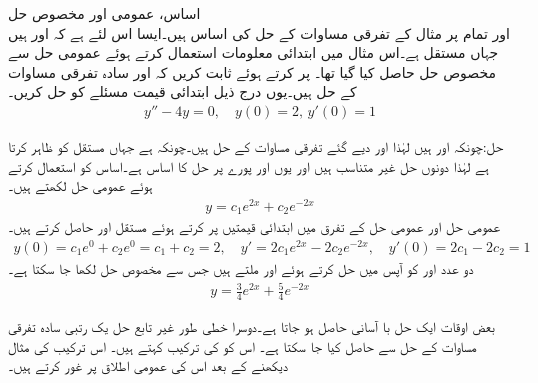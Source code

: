 \quad اساس، عمومی اور مخصوص حل\\
 اور  تمام  پر مثال  کے تفرقی مساوات  کے حل کی اساس ہیں۔ایسا اس لئے ہے کہ  اور  ہیں جہاں  مستقل ہے۔اس مثال میں ابتدائی معلومات استعمال کرتے ہوئے عمومی حل سے مخصوص حل  حاصل کیا گیا تھا۔
پر کرتے ہوئے ثابت کریں کہ  اور  سادہ تفرقی مساوات  کے حل ہیں۔یوں درج ذیل ابتدائی قیمت مسئلے کو حل کریں۔
\begin{align*}
y''-4y=0, \quad y(0)=2, \, y'(0)=1
\end{align*}

حل:چونکہ  اور   ہیں لہٰذا  اور  دیے گئے تفرقی مساوات کے حل ہیں۔چونکہ  ہے جہاں  مستقل کو ظاہر کرتا ہے  لہٰذا دونوں حل غیر متناسب ہیں اور یوں  اور  پورے  پر  حل کا  اساس ہے۔اساس کو استعمال کرتے ہوئے عمومی حل لکھتے ہیں۔
\begin{align*}
y=c_1e^{2x}+c_2e^{-2x}
\end{align*}
عمومی حل اور عمومی حل کے تفرق میں ابتدائی قیمتیں پر کرتے ہوئے مستقل  اور  حاصل کرتے ہیں۔
\begin{align*}
y(0)=c_1e^{0}+c_2e^{0}=c_1+c_2=2, \quad y'=2c_1e^{2x}-2c_2e^{-2x}, \quad y'(0)=2c_1-2c_2=1
\end{align*}
دو عدد   اور  کو آپس میں حل کرتے ہوئے  اور  ملتے ہیں جس سے مخصوص حل لکھا جا سکتا ہے۔
\begin{align*}
y=\frac{3}{4}e^{2x}+\frac{5}{4}e^{-2x}
\end{align*}

بعض اوقات ایک حل با آسانی حاصل ہو جاتا ہے۔دوسرا خطی طور غیر تابع حل یک رتبی سادہ تفرقی مساوات کے حل سے حاصل کیا جا سکتا ہے۔ اس کو  کی ترکیب کہتے ہیں۔ اس ترکیب کی مثال دیکھنے کے بعد اس کی عمومی اطلاق پر غور کرتے ہیں۔

